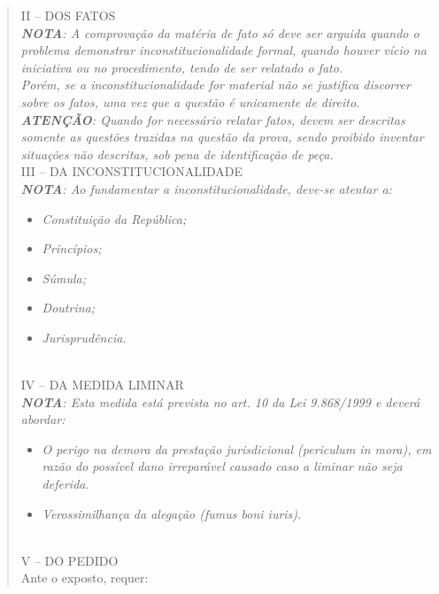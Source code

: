 \documentclass{article}
\begin{document}
\begin{quote}
II – DOS FATOS\\

\textit{\textbf{NOTA}: A comprovação da matéria de fato só deve ser arguida quando o problema demonstrar inconstitucionalidade formal, quando houver vício na iniciativa ou no procedimento, tendo de ser relatado o fato.\\
Porém, se a inconstitucionalidade for material não se justifica discorrer sobre os fatos, uma vez que a questão é unicamente de direito.\\
\textbf{ATENÇÃO}: Quando for necessário relatar fatos, devem ser descritas somente as questões trazidas na questão da prova, sendo proibido inventar situações não descritas, sob pena de identificação de peça.}\\

III – DA INCONSTITUCIONALIDADE\\

\textit{\textbf{NOTA}: Ao fundamentar a inconstitucionalidade, deve-se atentar a:}

\begin{itemize}
    \item \textit{Constituição da República;}
    \item \textit{Princípios;}
    \item \textit{Súmula;}
    \item \textit{Doutrina;}
    \item \textit{Jurisprudência.}\\
\end{itemize}
\\

IV – DA MEDIDA LIMINAR\\

\textit{\textbf{NOTA}: Esta medida está prevista no art. 10 da Lei 9.868/1999 e deverá abordar:}

\begin{itemize}
    \item \textit{O perigo na demora da prestação jurisdicional (periculum in mora), em razão do possível dano irreparável causado caso a liminar não seja deferida.}
    \item \textit{Verossimilhança da alegação (fumus boni iuris).}
\end{itemize}\\

V – DO PEDIDO\\

Ante o exposto, requer:\\


\end{quote}
\end{document}
